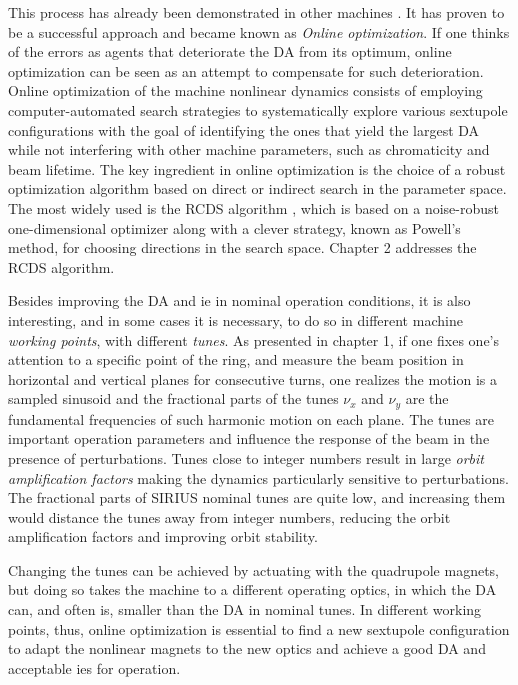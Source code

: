 This process has already been demonstrated in other machines \cite{huang_algorithm_2013, huang_online_2015,liuzzo_rcds_2016,olsson_online_2018, yang_online_2022}. It has proven to be a successful approach and became known as \textit{Online optimization}. If one thinks of the errors as agents that deteriorate the DA from its optimum, online optimization can be seen as an attempt to compensate for such deterioration. Online optimization of the machine nonlinear dynamics consists of employing computer-automated search strategies to systematically explore various sextupole configurations with the goal of identifying the ones that yield the largest DA while not interfering with other machine parameters, such as chromaticity and beam lifetime. The key ingredient in online optimization is the choice of a robust optimization algorithm based on direct or indirect search in the parameter space. The most widely used is the \gls*{RCDS} algorithm \cite{huang_algorithm_2013}, which is based on a noise-robust one-dimensional optimizer along with a clever strategy, known as Powell's method, for choosing directions in the search space. Chapter 2 addresses the RCDS algorithm.

Besides improving the \gls*{DA} and \gls*{ie} in nominal operation conditions, it is also interesting, and in some cases it is necessary, to do so in different machine \textit{working points}, with different \textit{tunes}. As presented in chapter 1, if one fixes one's attention to a specific point of the ring, and measure the beam position in horizontal and vertical planes for consecutive turns, one realizes the motion is a sampled sinusoid and the fractional parts of the tunes $\nu_x$ and $\nu_y$ are the fundamental frequencies of such harmonic motion on each plane. The tunes are important operation parameters and influence the response of the beam in the presence of perturbations. Tunes close to integer numbers result in large \textit{orbit amplification factors} making the dynamics particularly sensitive to perturbations. The fractional parts of SIRIUS nominal tunes are quite low, and increasing them would distance the tunes away from integer numbers, reducing the orbit amplification factors and improving orbit stability.

Changing the tunes can be achieved by actuating with the quadrupole magnets, but doing so takes the machine to a different operating optics, in which the DA can, and often is, smaller than the \gls*{DA} in nominal tunes. In different working points, thus, online optimization is essential to find a new sextupole configuration to adapt the nonlinear magnets to the new optics and achieve a good DA and acceptable \glspl*{ie} for operation.

